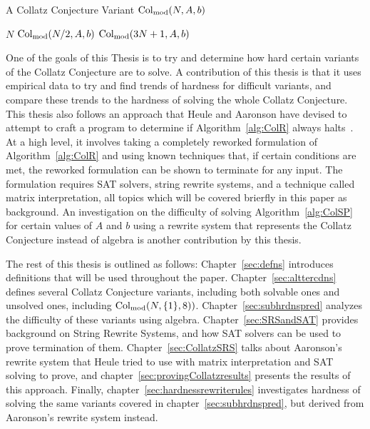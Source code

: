 \begin{algorithm} 
\caption{A Collatz Conjecture Variant $\mathrm{Col}_{\text{mod}}(N,A,b)$}
\label{alg:ColSP} 
\begin{algorithmic}[1]
     \Return $N$
    \EndIf
     \Return $\mathrm{Col}_{\text{mod}}(N/2,A,b)$
    \EndIf
    \State \Return $\mathrm{Col}_{\text{mod}}(3N+1,A,b)$ 
\end{algorithmic}
\end{algorithm}
One of the goals of this Thesis is to try and determine how hard certain variants of the Collatz Conjecture are to solve. A contribution of this thesis is that it uses empirical data to try and find trends of hardness for difficult variants, and compare these trends to the hardness of solving the whole Collatz Conjecture. This thesis also follows an approach that Heule and Aaronson have devised to attempt to craft a program to determine if Algorithm~\ref{alg:ColR} always halts~\cite{HeuleAaronson}. At a high level, it involves taking a completely reworked formulation of Algorithm~\ref{alg:ColR} and using known techniques that, if certain conditions are met, the reworked formulation can be shown to terminate for any input. The formulation requires SAT solvers, string rewrite systems, and a technique called matrix interpretation, all topics which will be covered brierfly in this paper as background. An investigation on the difficulty of solving Algorithm~\ref{alg:ColSP} for certain values of $A$ and $b$ using a rewrite system that represents the Collatz Conjecture instead of algebra is another contribution by this thesis.\par
The rest of this thesis is outlined as follows: Chapter~\ref{sec:defns} introduces definitions that will be used throughout the paper. Chapter~\ref{sec:alttercdns} defines several Collatz Conjecture variants, including both solvable ones and unsolved ones, including $\mathrm{Col}_{\text{mod}}(N,\{1\},8))$. Chapter~\ref{sec:subhrdnspred} analyzes the difficulty of these variants using algebra. Chapter~\ref{sec:SRSandSAT} provides background on String Rewrite Systems, and how SAT solvers can be used to prove termination of them. Chapter~\ref{sec:CollatzSRS} talks about Aaronson's rewrite system that Heule tried to use with matrix interpretation and SAT solving to prove, and chapter~\ref{sec:provingCollatzresults} presents the results of this approach. Finally, chapter~\ref{sec:hardnessrewriterules} investigates hardness of solving the same variants covered in chapter~\ref{sec:subhrdnspred}, but derived from Aaronson's rewrite system instead.


